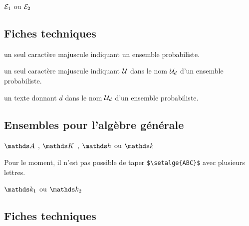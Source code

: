 \documentclass[12pt,a4paper]{article}
\begin{document}



\begin{latexex}
$\setproba*{E}{1}$ ou
$\setproba*{E}{2}$
\end{latexex}




\subsection{Fiches techniques}


\IDarg{} un seul caractère \ascii{} majuscule indiquant un ensemble probabiliste.


\separation



 un seul caractère \ascii{} majuscule indiquant $\setproba{U}$ dans le nom $\setproba*{U}{d}$ d'un ensemble probabiliste.

 un texte donnant $d$ dans le nom $\setproba*{U}{d}$ d'un ensemble probabiliste.




\subsection{Ensembles pour l'algèbre générale} \label{tnssets-algebra-sets}

\newparaexample{}

\begin{latexex}
$\setalge{A}$ ,
$\setalge{K}$ ,
$\setalge{h}$ ou
$\setalge{k}$
\end{latexex}

\begin{remark}
	Pour le moment, il n'est pas possible de taper \verb+$\setalge{ABC}$+ avec plusieurs lettres.
\end{remark}





\begin{latexex}
$\setalge*{k}{1}$ ou $\setalge*{k}{2}$
\end{latexex}




\subsection{Fiches techniques}
\end{document}
